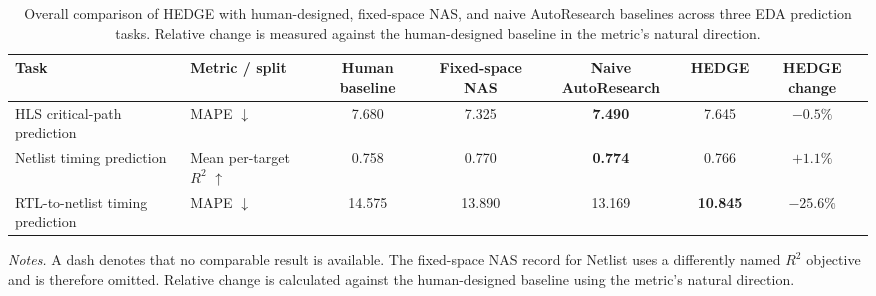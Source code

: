 \begin{table}[t]
\centering
\caption{Overall comparison of HEDGE with human-designed, fixed-space NAS, and naive AutoResearch baselines across three EDA prediction tasks. Relative change is measured against the human-designed baseline in the metric's natural direction.}
\label{tab:main_results}
\small
\setlength{\tabcolsep}{5pt}
\begin{tabular}{llccccc}
\toprule
\textbf{Task} & \textbf{Metric / split} & \textbf{Human baseline} & \textbf{Fixed-space NAS} & \textbf{Naive AutoResearch} & \textbf{HEDGE} & \textbf{HEDGE change} \\
\midrule
HLS critical-path prediction
& MAPE $\downarrow$
& 7.680
& 7.325
& \textbf{7.490}
& 7.645
& $-0.5\%$ \\

Netlist timing prediction
& Mean per-target $R^2$ $\uparrow$
& 0.758
& 0.770
& \textbf{0.774}
& 0.766
& $+1.1\%$ \\

RTL-to-netlist timing prediction
& MAPE $\downarrow$
& 14.575
& 13.890
& 13.169
& \textbf{10.845}
& $-25.6\%$ \\
\bottomrule
\end{tabular}
\vspace{2pt}
\begin{minipage}{0.98\textwidth}
\footnotesize
\textit{Notes.} A dash denotes that no comparable result is available. The fixed-space NAS record for Netlist uses a differently named $R^2$ objective and is therefore omitted. Relative change is calculated against the human-designed baseline using the metric's natural direction.
\end{minipage}
\end{table}
